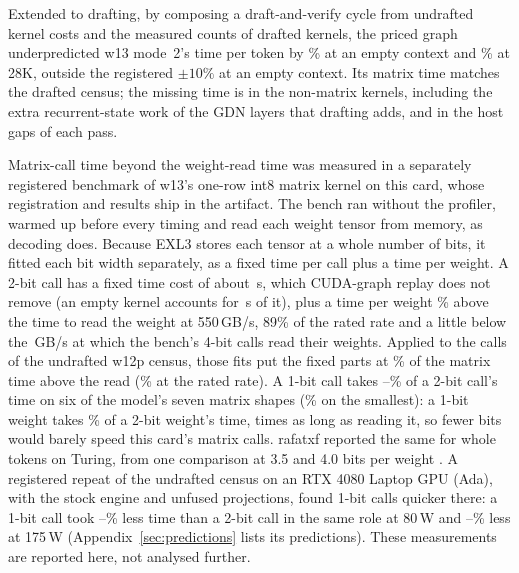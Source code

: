 \documentclass[11pt,letterpaper]{article}
\begin{document}
Extended to drafting, by composing a draft-and-verify cycle from undrafted
kernel costs and the measured counts of drafted kernels, the priced graph
underpredicted w13 mode~2's time per
token by \PeTThreeErrZero\% at an empty context and \PeTThreeErrTwentyEight\% at
28K, outside the registered $\pm10\%$ at an empty context. Its matrix time
matches the drafted census; the missing time is in the non-matrix kernels,
including the extra recurrent-state work of the GDN layers that drafting
adds, and in the host gaps of each pass.

Matrix-call time beyond the weight-read time was measured
in a separately registered benchmark of w13's one-row int8 matrix
kernel on this card, whose registration and results ship in the artifact. The
bench ran without the profiler, warmed up before every timing and read each
weight tensor from memory, as decoding does. Because EXL3 stores each tensor
at a whole number of bits, it fitted each bit width separately, as a fixed
time per call plus a time per weight. A 2-bit call has a fixed time cost of
about \PeNineFixedTwo\,\textmu s, which CUDA-graph replay does not remove (an
empty kernel accounts for \PeNinePhNull\,\textmu s of it), plus a time per
weight \PeNinePerWeightTwoPct\% above the time to read the weight at
550\,GB/s, 89\% of the rated rate and a little below the
\PeNineFourBitGbs\,GB/s at which the bench's 4-bit calls read their weights.
Applied to the calls of the undrafted w12p census, those fits put the fixed
parts at \PeNineShare\% of the matrix time above the read (\PeNineShareRated\%
at the rated rate). A 1-bit call takes
\PeNineOneTwoLo--\PeNineOneTwoHi\% of a 2-bit call's time on six of the
model's seven matrix shapes (\PeNineOneTwoKv\% on the smallest): a 1-bit
weight takes \PeNineOneTwoPerWeight\% of a 2-bit weight's time,
\PeNinePerWeightOneX{} times as long as reading it, so fewer bits would barely
speed this card's matrix calls. rafatxf reported the same for whole tokens on
Turing, from one comparison at 3.5 and 4.0 bits per weight
\citep{rafatxf2026turing}. A registered repeat of the undrafted census on an
RTX 4080 Laptop GPU (Ada), with the stock engine and unfused projections,
found 1-bit calls quicker there: a 1-bit call took
\PeAdaOneFasterLo--\PeAdaOneFasterHi\% less time than a 2-bit call in the same
role at 80\,W and \PeAdaBoostOneFasterLo--\PeAdaBoostOneFasterHi\% less at
175\,W (Appendix~\ref{sec:predictions} lists its predictions). These
measurements are reported here, not analysed further.
\end{document}
